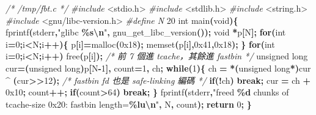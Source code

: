 \documentclass[10pt,a4paper]{article}
\newenvironment{Shaded}{\begin{snugshade}}{\end{snugshade}}
\newcommand{\BaseNTok}[1]{\textcolor[rgb]{0.00,0.00,0.81}{#1}}
\newcommand{\CommentTok}[1]{\textcolor[rgb]{0.56,0.35,0.01}{\textit{#1}}}
\newcommand{\ControlFlowTok}[1]{\textcolor[rgb]{0.13,0.29,0.53}{\textbf{#1}}}
\newcommand{\DataTypeTok}[1]{\textcolor[rgb]{0.13,0.29,0.53}{#1}}
\newcommand{\DecValTok}[1]{\textcolor[rgb]{0.00,0.00,0.81}{#1}}
\newcommand{\ImportTok}[1]{#1}
\newcommand{\NormalTok}[1]{#1}
\newcommand{\OperatorTok}[1]{\textcolor[rgb]{0.81,0.36,0.00}{\textbf{#1}}}
\newcommand{\PreprocessorTok}[1]{\textcolor[rgb]{0.56,0.35,0.01}{\textit{#1}}}
\newcommand{\SpecialCharTok}[1]{\textcolor[rgb]{0.81,0.36,0.00}{\textbf{#1}}}
\newcommand{\StringTok}[1]{\textcolor[rgb]{0.31,0.60,0.02}{#1}}
\renewenvironment{Shaded}{%
  \def\FrameCommand{\fboxsep=3.2pt\colorbox{shadecolor}}%
  \MakeFramed{\advance\hsize-\width\FrameRestore\small}%
}{%
  \endMakeFramed
}
\begin{document}
\begin{Shaded}
\begin{Highlighting}[]
\CommentTok{/* /tmp/fbt.c */}
\PreprocessorTok{\#include }\ImportTok{\textless{}stdio.h\textgreater{}}
\PreprocessorTok{\#include }\ImportTok{\textless{}stdlib.h\textgreater{}}
\PreprocessorTok{\#include }\ImportTok{\textless{}string.h\textgreater{}}
\PreprocessorTok{\#include }\ImportTok{\textless{}gnu/libc{-}version.h\textgreater{}}
\PreprocessorTok{\#define N }\DecValTok{20}
\DataTypeTok{int}\NormalTok{ main}\OperatorTok{(}\DataTypeTok{void}\OperatorTok{)\{}
\NormalTok{    fprintf}\OperatorTok{(}\NormalTok{stderr}\OperatorTok{,}\StringTok{"glibc }\SpecialCharTok{\%s\textbackslash{}n}\StringTok{"}\OperatorTok{,}\NormalTok{ gnu\_get\_libc\_version}\OperatorTok{());}
    \DataTypeTok{void} \OperatorTok{*}\NormalTok{p}\OperatorTok{[}\NormalTok{N}\OperatorTok{];}
    \ControlFlowTok{for}\OperatorTok{(}\DataTypeTok{int}\NormalTok{ i}\OperatorTok{=}\DecValTok{0}\OperatorTok{;}\NormalTok{i}\OperatorTok{\textless{}}\NormalTok{N}\OperatorTok{;}\NormalTok{i}\OperatorTok{++)\{}\NormalTok{ p}\OperatorTok{[}\NormalTok{i}\OperatorTok{]=}\NormalTok{malloc}\OperatorTok{(}\BaseNTok{0x18}\OperatorTok{);}\NormalTok{ memset}\OperatorTok{(}\NormalTok{p}\OperatorTok{[}\NormalTok{i}\OperatorTok{],}\BaseNTok{0x41}\OperatorTok{,}\BaseNTok{0x18}\OperatorTok{);} \OperatorTok{\}}
    \ControlFlowTok{for}\OperatorTok{(}\DataTypeTok{int}\NormalTok{ i}\OperatorTok{=}\DecValTok{0}\OperatorTok{;}\NormalTok{i}\OperatorTok{\textless{}}\NormalTok{N}\OperatorTok{;}\NormalTok{i}\OperatorTok{++)}\NormalTok{ free}\OperatorTok{(}\NormalTok{p}\OperatorTok{[}\NormalTok{i}\OperatorTok{]);}   \CommentTok{/* 前 7 個進 tcache，其餘進 fastbin */}
    \DataTypeTok{unsigned} \DataTypeTok{long}\NormalTok{ cur}\OperatorTok{=(}\DataTypeTok{unsigned} \DataTypeTok{long}\OperatorTok{)}\NormalTok{p}\OperatorTok{[}\NormalTok{N}\OperatorTok{{-}}\DecValTok{1}\OperatorTok{],}\NormalTok{ count}\OperatorTok{=}\DecValTok{1}\OperatorTok{,}\NormalTok{ ch}\OperatorTok{;}
    \ControlFlowTok{while}\OperatorTok{(}\DecValTok{1}\OperatorTok{)\{}\NormalTok{ ch }\OperatorTok{=} \OperatorTok{*(}\DataTypeTok{unsigned} \DataTypeTok{long}\OperatorTok{*)}\NormalTok{cur }\OperatorTok{\^{}} \OperatorTok{(}\NormalTok{cur}\OperatorTok{\textgreater{}\textgreater{}}\DecValTok{12}\OperatorTok{);}   \CommentTok{/* fastbin fd 也是 safe{-}linking 編碼 */}
              \ControlFlowTok{if}\OperatorTok{(!}\NormalTok{ch}\OperatorTok{)} \ControlFlowTok{break}\OperatorTok{;}\NormalTok{ cur }\OperatorTok{=}\NormalTok{ ch }\OperatorTok{+} \BaseNTok{0x10}\OperatorTok{;}\NormalTok{ count}\OperatorTok{++;} \ControlFlowTok{if}\OperatorTok{(}\NormalTok{count}\OperatorTok{\textgreater{}}\DecValTok{64}\OperatorTok{)} \ControlFlowTok{break}\OperatorTok{;} \OperatorTok{\}}
\NormalTok{    fprintf}\OperatorTok{(}\NormalTok{stderr}\OperatorTok{,}\StringTok{"freed }\SpecialCharTok{\%d}\StringTok{ chunks of tcache{-}size 0x20: fastbin length=}\SpecialCharTok{\%lu\textbackslash{}n}\StringTok{"}\OperatorTok{,}\NormalTok{ N}\OperatorTok{,}\NormalTok{ count}\OperatorTok{);}
    \ControlFlowTok{return} \DecValTok{0}\OperatorTok{;}
\OperatorTok{\}}
\end{Highlighting}
\end{Shaded}
\end{document}

